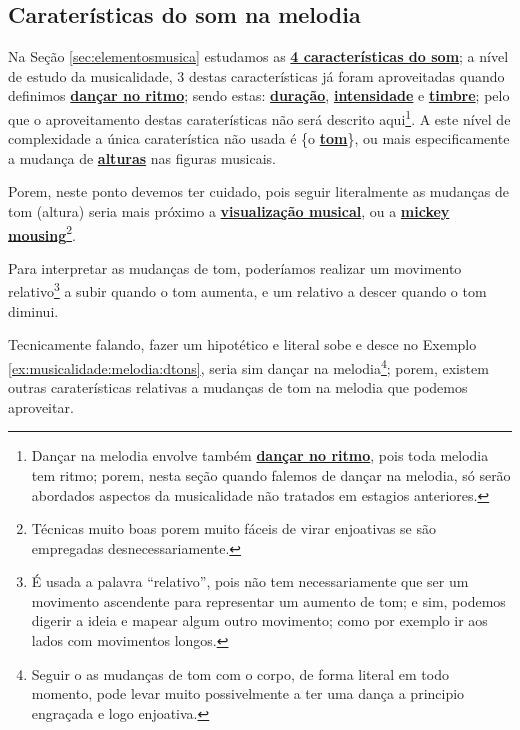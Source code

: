 \subsection{Caraterísticas do som na melodia} 
Na 
Seção \ref{sec:elementosmusica} estudamos as \hyperref[sec:carateristasom]{\textbf{4 características do som}};
a nível de estudo da musicalidade, 
3 destas características já foram aproveitadas quando definimos \hyperref[subsec:dancaritmo]{\textbf{dançar no ritmo}};
sendo estas: 
\hyperref[sec:pos:Duracion]{\textbf{duração}}, 
\hyperref[sec:pos:Intensidade]{\textbf{intensidade}} e 
\hyperref[sec:pos:timbre]{\textbf{timbre}};
pelo que o aproveitamento destas caraterísticas não será descrito aqui\footnote{\label{footn:melodiatemritmo}Dançar 
na melodia envolve também \hyperref[subsec:dancaritmo]{\textbf{dançar no ritmo}}, 
pois toda melodia tem ritmo; 
porem, nesta seção quando falemos de dançar na melodia, 
só serão abordados aspectos da musicalidade não tratados em estagios anteriores.}.
A este nível de complexidade a única caraterística não usada é 
\{o \hyperref[sec:pos:Altura]{\textbf{tom}}\},
ou mais especificamente a mudança de \hyperref[sec:pos:Altura]{\textbf{alturas}} nas figuras musicais.

Porem, neste ponto devemos ter cuidado, 
pois seguir literalmente as mudanças de tom (altura)
seria mais próximo a \hyperref[subsubsec:musicvisualization]{\textbf{visualização musical}},
 ou a \hyperref[sec:mikeymousing]{\textbf{mickey mousing}}\footnote{Técnicas 
muito boas porem muito fáceis de virar enjoativas se são empregadas desnecessariamente.}.


\begin{example} 
\label{ex:musicalidade:melodia:dtons}
Para interpretar as mudanças de tom, 
poderíamos realizar um movimento relativo\footnote{É usada a palavra ``relativo'',
pois não tem necessariamente que ser um movimento ascendente para representar um aumento de tom;
e sim, podemos digerir a ideia e mapear algum outro movimento; 
como por exemplo ir aos lados com movimentos longos.} 
a subir quando o tom aumenta,
e um relativo a descer quando o tom diminui.
\end{example}

Tecnicamente falando, 
fazer um hipotético e literal sobe e desce no Exemplo \ref{ex:musicalidade:melodia:dtons}, 
seria sim dançar na melodia\footnote{Seguir o as mudanças de tom com o corpo, 
de forma literal em todo momento, 
pode levar muito possivelmente a ter uma dança a principio engraçada e logo enjoativa.};
porem, 
existem outras caraterísticas relativas a mudanças de tom na melodia que podemos aproveitar. 

